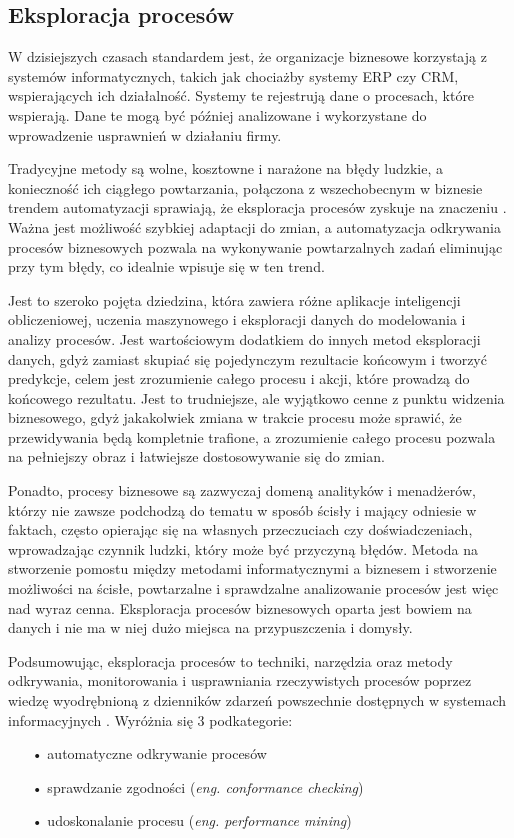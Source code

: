 \subsection{Eksploracja procesów}

W dzisiejszych czasach standardem jest, że organizacje biznesowe korzystają z systemów informatycznych, takich jak chociażby systemy ERP czy CRM, wspierających ich działalność. Systemy te rejestrują dane o procesach, które wspierają. Dane te mogą być później analizowane i wykorzystane do wprowadzenie usprawnień w działaniu firmy.   

Tradycyjne metody są wolne, kosztowne i narażone na błędy ludzkie, a konieczność ich ciągłego powtarzania, połączona z wszechobecnym w biznesie trendem automatyzacji sprawiają, że eksploracja procesów zyskuje na znaczeniu \cite{market-pm}. Ważna jest możliwość szybkiej adaptacji do zmian, a automatyzacja odkrywania procesów biznesowych pozwala na wykonywanie powtarzalnych zadań eliminując przy tym błędy, co idealnie wpisuje się w ten trend.

Jest to szeroko pojęta dziedzina, która zawiera różne aplikacje inteligencji obliczeniowej, uczenia maszynowego i eksploracji danych do modelowania i analizy procesów. 
Jest wartościowym dodatkiem do innych metod eksploracji danych, gdyż zamiast skupiać się pojedynczym rezultacie końcowym i tworzyć predykcje, celem jest zrozumienie całego procesu i akcji, które prowadzą do końcowego rezultatu. Jest to trudniejsze, ale wyjątkowo cenne z punktu widzenia biznesowego, gdyż jakakolwiek zmiana w trakcie procesu może sprawić, że przewidywania będą kompletnie trafione, a zrozumienie całego procesu pozwala na pełniejszy obraz i łatwiejsze dostosowywanie się do zmian. 

Ponadto, procesy biznesowe są zazwyczaj domeną analityków i menadżerów, którzy nie zawsze podchodzą do tematu w sposób ścisły i mający odniesie w faktach, często opierając się na własnych przeczuciach czy doświadczeniach, wprowadzając czynnik ludzki, który może być przyczyną błędów. Metoda na stworzenie pomostu między metodami informatycznymi a biznesem i stworzenie możliwości na ścisłe, powtarzalne i sprawdzalne analizowanie procesów jest więc nad wyraz cenna. Eksploracja procesów biznesowych oparta jest bowiem na danych i nie ma w niej dużo miejsca na przypuszczenia i domysły.

Podsumowując, eksploracja procesów to techniki, narzędzia oraz metody odkrywania, monitorowania i usprawniania rzeczywistych procesów poprzez wiedzę wyodrębnioną z dzienników zdarzeń powszechnie dostępnych w systemach informacyjnych \cite{pm-manifesto}\cite{mining-overview}.
Wyróżnia się 3 podkategorie: 
\begin{itemize}
  \item[•] automatyczne odkrywanie procesów
  \item[•] sprawdzanie zgodności (\textit{eng. conformance checking})
  \item[•] udoskonalanie procesu (\textit{eng. performance mining})
\end{itemize}



